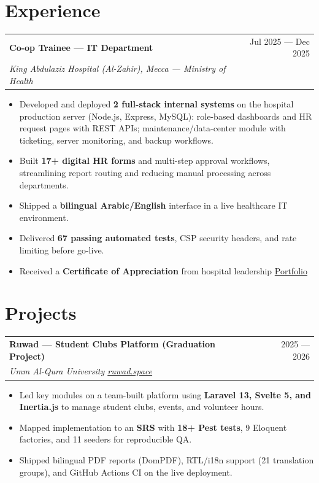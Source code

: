 \documentclass[11pt,a4paper]{article}
\makeatletter
\newcommand{\resumeSubheading}[4]{%
  \vspace{4pt}%
  \begin{tabularx}{\textwidth}{@{}X r@{}}
    \textbf{#1} & \textcolor{muted}{\small #2} \\
    \textit{#3} & \textcolor{muted}{\small #4} \\
  \end{tabularx}%
}
\newcommand{\resumeItem}[1]{\item\small{#1}}
\makeatother
\begin{document}
\section{Experience}
\resumeSubheading%
  {Co-op Trainee — IT Department}%
  {Jul 2025 — Dec 2025}%
  {King Abdulaziz Hospital (Al-Zahir), Mecca — Ministry of Health}%
  {}
\begin{itemize}[leftmargin=*, nosep, topsep=2pt]
  \resumeItem{Developed and deployed \textbf{2 full-stack internal systems} on the hospital production server (Node.js, Express, MySQL): role-based dashboards and HR request pages with REST APIs; maintenance/data-center module with ticketing, server monitoring, and backup workflows.}
  \resumeItem{Built \textbf{17+ digital HR forms} and multi-step approval workflows, streamlining report routing and reducing manual processing across departments.}
  \resumeItem{Shipped a \textbf{bilingual Arabic/English} interface in a live healthcare IT environment.}
  \resumeItem{Delivered \textbf{67 passing automated tests}, CSP security headers, and rate limiting before go-live.}
  \resumeItem{Received a \textbf{Certificate of Appreciation} from hospital leadership \textbar{} \href{https://alkabkabi1.github.io/portfolio/\#training}{Portfolio}}
\end{itemize}

\section{Projects}

\resumeSubheading%
  {Ruwad — Student Clubs Platform (Graduation Project)}%
  {2025 — 2026}%
  {Umm Al-Qura University \textbar{} \href{https://ruwad.space}{ruwad.space}}%
  {}
\begin{itemize}[leftmargin=*, nosep, topsep=2pt]
  \resumeItem{Led key modules on a team-built platform using \textbf{Laravel 13, Svelte 5, and Inertia.js} to manage student clubs, events, and volunteer hours.}
  \resumeItem{Mapped implementation to an \textbf{SRS} with \textbf{18+ Pest tests}, 9 Eloquent factories, and 11 seeders for reproducible QA.}
  \resumeItem{Shipped bilingual PDF reports (DomPDF), RTL/i18n support (21 translation groups), and GitHub Actions CI on the live deployment.}
\end{itemize}

\end{document}
